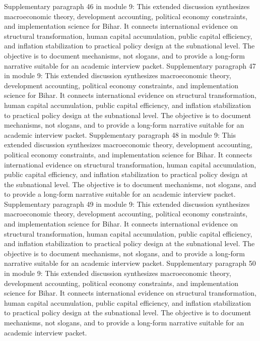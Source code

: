\documentclass[preprint,12pt]{elsarticle}
\begin{document}
Supplementary paragraph 46 in module 9: This extended discussion synthesizes macroeconomic theory, development accounting, political economy constraints, and implementation science for Bihar. It connects international evidence on structural transformation, human capital accumulation, public capital efficiency, and inflation stabilization to practical policy design at the subnational level. The objective is to document mechanisms, not slogans, and to provide a long-form narrative suitable for an academic interview packet.
Supplementary paragraph 47 in module 9: This extended discussion synthesizes macroeconomic theory, development accounting, political economy constraints, and implementation science for Bihar. It connects international evidence on structural transformation, human capital accumulation, public capital efficiency, and inflation stabilization to practical policy design at the subnational level. The objective is to document mechanisms, not slogans, and to provide a long-form narrative suitable for an academic interview packet.
Supplementary paragraph 48 in module 9: This extended discussion synthesizes macroeconomic theory, development accounting, political economy constraints, and implementation science for Bihar. It connects international evidence on structural transformation, human capital accumulation, public capital efficiency, and inflation stabilization to practical policy design at the subnational level. The objective is to document mechanisms, not slogans, and to provide a long-form narrative suitable for an academic interview packet.
Supplementary paragraph 49 in module 9: This extended discussion synthesizes macroeconomic theory, development accounting, political economy constraints, and implementation science for Bihar. It connects international evidence on structural transformation, human capital accumulation, public capital efficiency, and inflation stabilization to practical policy design at the subnational level. The objective is to document mechanisms, not slogans, and to provide a long-form narrative suitable for an academic interview packet.
Supplementary paragraph 50 in module 9: This extended discussion synthesizes macroeconomic theory, development accounting, political economy constraints, and implementation science for Bihar. It connects international evidence on structural transformation, human capital accumulation, public capital efficiency, and inflation stabilization to practical policy design at the subnational level. The objective is to document mechanisms, not slogans, and to provide a long-form narrative suitable for an academic interview packet.
\end{document}
